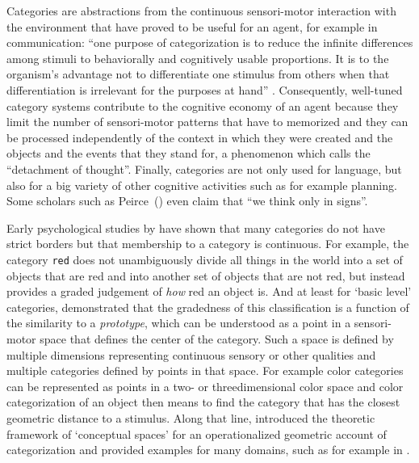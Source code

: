 Categories are abstractions from the continuous sensori-motor
interaction with the environment that have proved to be useful for an
agent, for example in communication: ``one purpose of categorization
is to reduce the infinite differences among stimuli to behaviorally
and cognitively usable proportions. It is to the organism's advantage
not to differentiate one stimulus from others when that
differentiation is irrelevant for the purposes at hand'' \citep[page
384]{rosch76basic}. Consequently, well-tuned category systems
contribute to the cognitive economy of an agent because they limit the
number of sensori-motor patterns that have to memorized and they can
be processed independently of the context in which they were created
and the objects and the events that they stand for, a phenomenon which
\cite{gardenfors05detachment} calls the ``detachment of
thought''. Finally, categories are not only used for language, but
also for a big variety of other cognitive activities such as for
example planning. Some scholars such as
Peirce~(\citeyear[p.~2.302]{peirce31collected}) even claim that ``we
think only in signs''.


Early psychological studies by \cite{rosch73natural} have shown that
many categories do not have strict borders but that membership to a
category is continuous. For example, the category \texttt{red} does
not unambiguously divide all things in the world into a set of objects
that are red and into another set of objects that are not red, but
instead provides a graded judgement of \emph{how} red an object
is. And at least for `basic level' categories, \cite{rosch73natural}
demonstrated that the gradedness of this classification is a function
of the similarity to a \emph{prototype}, which can be understood as a
point in a sensori-motor space that defines the center of the
category. Such a space is defined by multiple dimensions representing
continuous sensory or other qualities and multiple categories defined
by points in that space. For example color categories can be
represented as points in a two- or threedimensional color space and
color categorization of an object then means to find the category that
has the closest geometric distance to a stimulus. Along that line,
\cite{gardenfors00conceptual-spaces} introduced the theoretic
framework of `conceptual spaces' for an operationalized geometric
account of categorization and provided examples for many domains, such
as for example in \citep{gardenfors01reasoning}.\\


